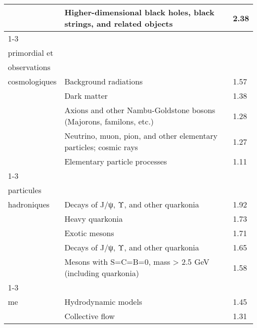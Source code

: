 \begin{longtable}[H]{p{}|p{}|p{}}
                                                                               & Higher-dimensional black holes, black strings, and related objects &  2.38 \\
\cline{1-3}
\multirow{5}{*}{\begin{tabular}{l}Univers\\ primordial et\\ observations\\ cosmologiques\end{tabular}} & Background radiations &  1.57 \\
                                                                               & Dark matter &  1.38 \\
                                                                               & Axions and other Nambu-Goldstone bosons (Majorons, familons, etc.) &  1.28 \\
                                                                               & Neutrino, muon, pion, and other elementary particles; cosmic rays &  1.27 \\
                                                                               & Elementary particle processes &  1.11 \\
\cline{1-3}
\multirow{5}{*}{\begin{tabular}{l}Zoo des\\ particules\\ hadroniques\end{tabular}} & Decays of J/ψ, Υ, and other quarkonia &  1.92 \\
                                                                               & Heavy quarkonia &  1.73 \\
                                                                               & Exotic mesons &  1.71 \\
                                                                               & Decays of J/ψ, Υ, and other quarkonia &  1.65 \\
                                                                               & Mesons with S=C=B=0, mass > 2.5 GeV (including quarkonia) &  1.58 \\
\cline{1-3}
\multirow{5}{*}{\begin{tabular}{l}Électromagnétis\\ me\end{tabular}} & Hydrodynamic models &  1.45 \\
                                                                               & Collective flow &  1.31 \\

\end{longtable}
